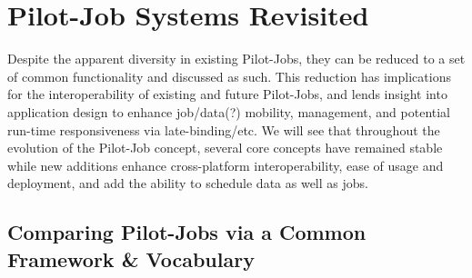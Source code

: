 \documentclass{sig-alternate}
\begin{document}



\section{Pilot-Job Systems Revisited}
Despite the apparent diversity in existing Pilot-Jobs,
they can be reduced to a set of common functionality and
discussed as such.  This reduction has implications
for the interoperability of existing and future Pilot-Jobs, and
lends insight into application design to enhance job/data(?)
mobility, management, and potential run-time responsiveness via
late-binding/etc.  We will see that throughout the evolution
of the Pilot-Job concept, several core concepts have remained stable
while new additions enhance cross-platform interoperability,
ease of usage and deployment, and add the ability to
schedule data as well as jobs. 



\subsection{Comparing Pilot-Jobs via a Common Framework \& Vocabulary}
\end{document}
